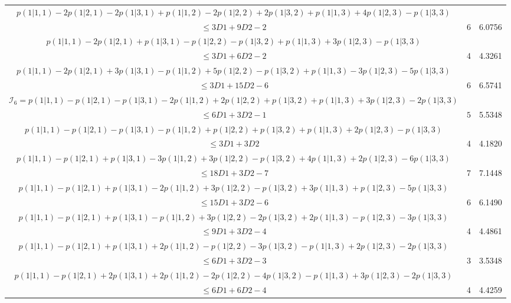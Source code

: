 \documentclass[11pt]{article}
\begin{document}
\begin{table}[htbp]
{\begin{tabular}{|c|c|c|}
    $p(1|1,1) -2p(1|2,1) -2p(1|3,1) +p(1|1,2) -2p(1|2,2) +2p(1|3,2) +p(1|1,3) +4p(1|2,3) -p(1|3,3)$&&\\$ \leqslant 3D1 +9D2  -2$ &6&  6.0756 \\ \hline

    $p(1|1,1) -2p(1|2,1) +p(1|3,1) -p(1|2,2) -p(1|3,2) +p(1|1,3) +3p(1|2,3) -p(1|3,3)$&&\\$ \leqslant 3D1 +6D2 -2$& 4 & 4.3261\\ \hline

    $p(1|1,1) -2p(1|2,1) +3p(1|3,1) -p(1|1,2) +5p(1|2,2) -p(1|3,2) +p(1|1,3) -3p(1|2,3) -5p(1|3,3)$&&\\$ \leqslant 3D1 +15D2  -6$ & 6 & 6.5741 \\ \hline

    $\mathcal{I}_6=p(1|1,1) -p(1|2,1) -p(1|3,1) -2p(1|1,2) +2p(1|2,2) +p(1|3,2) +p(1|1,3) +3p(1|2,3) -2p(1|3,3)$&&\\$ \leqslant 6D1 +3D2  -1$ & $5$&5.5348 \\ \hline

    $p(1|1,1) -p(1|2,1) -p(1|3,1) -p(1|1,2) +p(1|2,2) +p(1|3,2) +p(1|1,3) +2p(1|2,3) -p(1|3,3)$&&\\$ \leqslant 3D1 +3D2 $ & 4& 4.1820\\ \hline

    $p(1|1,1) -p(1|2,1) +p(1|3,1) -3p(1|1,2) +3p(1|2,2) -p(1|3,2) +4p(1|1,3) +2p(1|2,3) -6p(1|3,3)$&&\\$ \leqslant 18D1 +3D2 -7$& 7&7.1448 \\ \hline

    $p(1|1,1) -p(1|2,1) +p(1|3,1) -2p(1|1,2) +3p(1|2,2) -p(1|3,2) +3p(1|1,3) +p(1|2,3) -5p(1|3,3)$&&\\$ \leqslant 15D1 +3D2  -6$ & 6 &6.1490 \\ \hline

    $p(1|1,1) -p(1|2,1) +p(1|3,1) -p(1|1,2) +3p(1|2,2) -2p(1|3,2) +2p(1|1,3) -p(1|2,3) -3p(1|3,3)$&&\\$ \leqslant 9D1 +3D2  -4$ & 4 & 4.4861 \\ \hline

    $p(1|1,1) -p(1|2,1) +p(1|3,1) +2p(1|1,2) -p(1|2,2) -3p(1|3,2) -p(1|1,3) +2p(1|2,3) -2p(1|3,3)$&&\\$ \leqslant 6D1 +3D2  -3$ & 3 & 3.5348\\ \hline

    $ p(1|1,1) -p(1|2,1) +2p(1|3,1) +2p(1|1,2) -2p(1|2,2) -4p(1|3,2) -p(1|1,3) +3p(1|2,3) -2p(1|3,3)$&&\\$ \leqslant 6D1 + 6D2 -4$ & 4 & 4.4259 \\ \hline


\end{tabular}}
\end{table}
\end{document}
